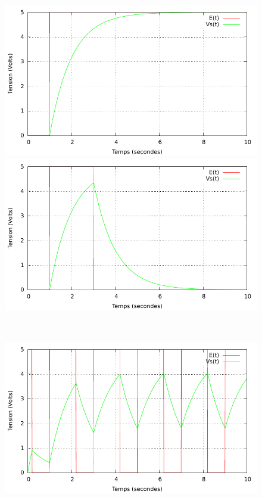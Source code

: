 \documentclass[a4paper,11pt]{article}
\begin{document}
\begin{figure}[h!]
   \begin{minipage}[b]{0.5\linewidth}
      \centering \includegraphics[scale=0.68]{CAechelon.pdf}
   \end{minipage}\hfill
   \begin{minipage}[b]{0.5\linewidth}   
      \centering \includegraphics[scale=.68]{CAporte.pdf}
   \end{minipage}\\
    \begin{minipage}[b]{0.5\linewidth}   
      \centering \includegraphics[scale=.68]{CAcarre.pdf}

\end{minipage}
\end{figure}
\end{document}
